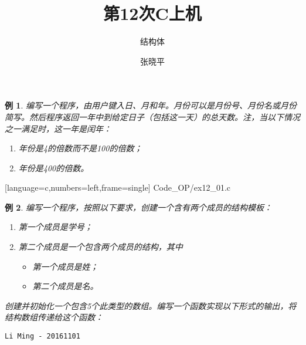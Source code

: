 \documentclass[10pt,notheorems]{beamer}
\newtheorem{li}{例}
\begin{document}
\title{第12次C上机}
\subtitle{结构体}
\author{张晓平}


\begin{frame}[plain]\transboxout
\titlepage
\end{frame}




\begin{frame}[fragile]
  \begin{li}
    编写一个程序，由用户键入日、月和年。月份可以是月份号、月份名或月份简写。然后程序返回一年中到给定日子（包括这一天）的总天数。注，当以下情况之一满足时，这一年是闰年： 
    \begin{enumerate}
    	\item 年份是4的倍数而不是100的倍数； 
    	\item 年份是400的倍数。
    \end{enumerate}
\end{li}
\end{frame}


\begin{frame}

[language=c,numbers=left,frame=single]
{Code_OP/ex12_01.c}
\end{frame}

\begin{frame}[fragile]
  \begin{li}
    编写一个程序，按照以下要求，创建一个含有两个成员的结构模板：
    \begin{enumerate}
    \item 第一个成员是学号；
    \item 第二个成员是一个包含两个成员的结构，其中
      \begin{itemize}
        \item 第一个成员是姓；
        \item 第二个成员是名。
      \end{itemize}
    \end{enumerate}
    创建并初始化一个包含5个此类型的数组。编写一个函数实现以下形式的输出，将结构数组传递给这个函数：
      \begin{lstlisting}
Li Ming - 20161101
      \end{lstlisting}
\end{li}
\end{frame}
\end{document}
